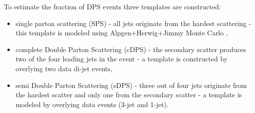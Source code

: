 \documentclass{ws-rv9x6}
\begin{document}
To estimate the fraction of DPS events three templates are constructed:
\begin{itemize}
\item single parton scattering (SPS) - all jets originate from the hardest scattering - this template is modeled using Alpgen+Herwig+Jimmy Monte Carlo \cite{aahj,ahhj,ahjj},
\item complete Double Parton Scattering (cDPS) - the secondary scatter produces two of the four leading jets in the event - a template is constructed by overlying two data di-jet events, 
\item semi Double Parton Scattering (sDPS) - three out of four jets originate from the hardest scatter and only one from the secondary scatter - a template is modeled by overlying data events (3-jet and 1-jet).   
\end{itemize}
\end{document}
